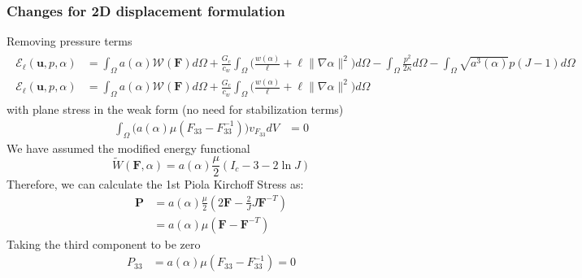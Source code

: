 \documentclass[12pt,3p]{article}
\numberwithin{equation}{section}
\begin{document}
\subsubsection{Changes for 2D displacement formulation}
Removing pressure terms
\begin{align*}
\begin{split}
\mathcal{E}_{\ell}\left(\boldsymbol{u}, p, \alpha\right) &= \int_{\Omega} a(\alpha) \mathcal{W}(\mathbf{F}) d \Omega + \frac{G_{c}}{c_{w}} \int_{\Omega} \bigg(\frac{w(\alpha)}{\ell}+\ell\|\nabla \alpha\|^{2} \bigg) d \Omega- \int_{\Omega} \frac{p^{2}}{2 \kappa} d \Omega - \int_{\Omega} \sqrt{a^{3}(\alpha)} p(J-1) d \Omega \\
\mathcal{E}_{\ell}\left(\boldsymbol{u}, p, \alpha\right) &= \int_{\Omega} a(\alpha) \mathcal{W}(\mathbf{F}) d \Omega + \frac{G_{c}}{c_{w}} \int_{\Omega} \bigg(\frac{w(\alpha)}{\ell}+\ell\|\nabla \alpha\|^{2} \bigg) d \Omega
\end{split}
\end{align*}
with plane stress in the weak form (no need for stabilization terms)
\begin{align*}
\int_{\Omega} \big( a(\alpha) \mu (F_{33} - F_{33}^{-1}) \big) v_{F_{33}} dV &= 0
\end{align*}
We have assumed the modified energy functional
\begin{equation}
\widetilde{W} (\mathbf{F}, \alpha) = a (\alpha) \frac{\mu}{2} (I_c - 3 - 2 \ln J) 
\end{equation}
Therefore, we can calculate the 1st Piola Kirchoff Stress as:
\begin{align*}
\mathbf{P} &= a (\alpha) \frac{\mu}{2} (2 \mathbf{F} - \frac{2}{J} J \mathbf{F}^{-T}) \\
		&= a (\alpha) \mu (\mathbf{F} - \mathbf{F}^{-T})
\end{align*}
Taking the third component to be zero
\begin{align*}
P_{33} &= a(\alpha) \mu (F_{33} - F_{33}^{-1}) = 0 
\end{align*}


\end{document}
